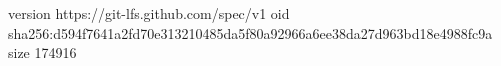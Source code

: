version https://git-lfs.github.com/spec/v1
oid sha256:d594f7641a2fd70e313210485da5f80a92966a6ee38da27d963bd18e4988fc9a
size 174916
